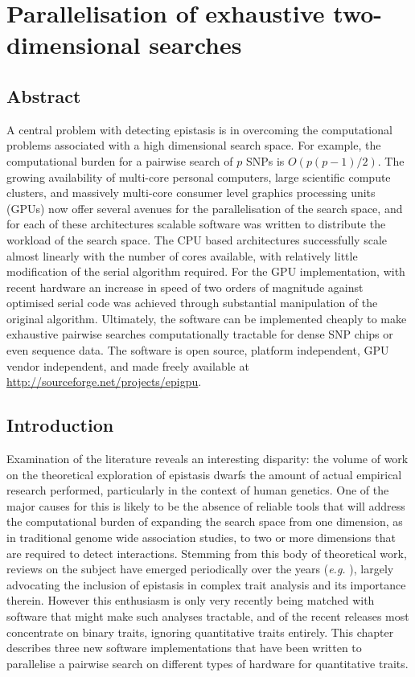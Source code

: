 \chapter{Parallelisation of exhaustive two-dimensional searches}
\label{Results2}


\section{Abstract}
A central problem with detecting epistasis is in overcoming the computational problems associated with a high dimensional search space. For example, the computational burden for a pairwise search of $p$ SNPs is $O(p(p-1)/2)$. The growing availability of multi-core personal computers, large scientific compute clusters, and massively multi-core consumer level graphics processing units (GPUs) now offer several avenues for the parallelisation of the search space, and for each of these architectures scalable software was written to distribute the workload of the search space. The CPU based architectures successfully scale almost linearly with the number of cores available, with relatively little modification of the serial algorithm required. For the GPU implementation, with recent hardware an increase in speed of two orders of magnitude against optimised serial code was achieved through substantial manipulation of the original algorithm. Ultimately, the software can be implemented cheaply to make exhaustive pairwise searches computationally tractable for dense SNP chips or even sequence data. The software is open source, platform independent, GPU vendor independent, and made freely available at \href{http://sourceforge.net/projects/epigpu}{http://sourceforge.net/projects/epigpu}.

\section{Introduction}
Examination of the literature reveals an interesting disparity: the volume of work on the theoretical exploration of epistasis dwarfs the amount of actual empirical research performed, particularly in the context of human genetics. One of the major causes for this is likely to be the absence of reliable tools that will address the computational burden of expanding the search space from one dimension, as in traditional genome wide association studies, to two or more dimensions that are required to detect interactions. Stemming from this body of theoretical work, reviews on the subject have emerged periodically over the years (\emph{e.g.} \cite{Phillips1998, Cordell2002, Carlborg2004, Moore2005, Wagner2011}), largely advocating the inclusion of epistasis in complex trait analysis and its importance therein. However this enthusiasm is only very recently being matched with software that might make such analyses tractable, and of the recent releases most concentrate on binary traits, ignoring quantitative traits entirely. This chapter describes three new software implementations that have been written to parallelise a pairwise search on different types of hardware for quantitative traits.

